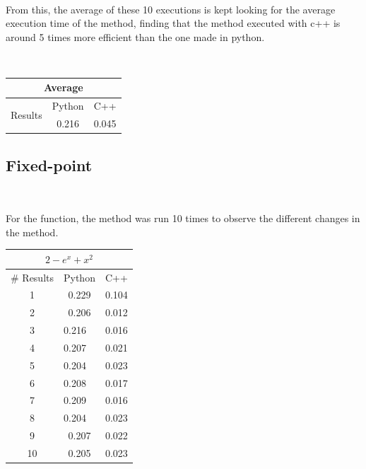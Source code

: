 \documentclass[conference]{IEEEtran}
\begin{document}
\





From this, the average of these 10 executions is kept looking for the average execution time of the method, finding that the method executed with c++ is around 5 times more efficient than the one made in python.

\


\begin{tabular}{|c|c|c|}
\hline
\multicolumn{3}{|c|}{Average}             \\ \hline
\multirow{2}{*}{Results} & Python & C++   \\ \cline{2-3} 
                         & 0.216  & 0.045 \\ \hline
\end{tabular}




\subsection{Fixed-point}

\

For the function, the method was run 10 times to observe the different changes in the method.



\begin{tabular}{|c|l|l}
\hline
\multicolumn{3}{|c|}{\(2 - e^x + x ^2\)}     \\ \hline
\# Results & \multicolumn{1}{c|}{Python} & \multicolumn{1}{c|}{C++}   \\ \hline
1          & \multicolumn{1}{c|}{0.229}  & \multicolumn{1}{c|}{0.104} \\ \hline
2          & \multicolumn{1}{c|}{0.206}  & \multicolumn{1}{c|}{0.012} \\ \hline
3          & 0.216                       & \multicolumn{1}{l|}{0.016} \\ \hline
4          & 0.207                       & \multicolumn{1}{l|}{0.021} \\ \hline
5          & 0.204                       & \multicolumn{1}{l|}{0.023} \\ \hline
6          & 0.208                       & \multicolumn{1}{l|}{0.017} \\ \hline
7          & 0.209                       & \multicolumn{1}{l|}{0.016} \\ \hline
8          & 0.204                       & \multicolumn{1}{l|}{0.023} \\ \hline
9          & \multicolumn{1}{c|}{0.207}  & \multicolumn{1}{c|}{0.022} \\ \hline
10         & \multicolumn{1}{c|}{0.205}  & \multicolumn{1}{c|}{0.023}  \\ \hline
\end{tabular}
\end{document}
